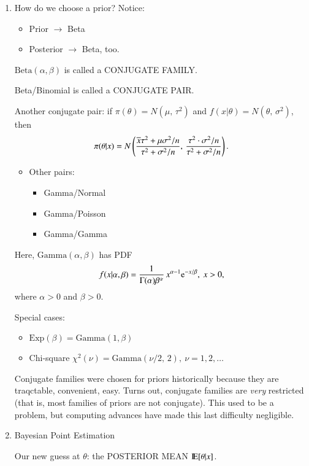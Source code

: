 \documentclass[11pt,english]{scrbook}
\begin{document}
\begin{enumerate}
\item How do we choose a prior?
\label{sec:orge958842}
Notice:
\begin{itemize}
\item Prior \(\to\) Beta
\item Posterior \(\to\) Beta, too.
\end{itemize}

\(\mathrm{Beta}(\alpha,\beta)\) is called a CONJUGATE FAMILY.

Beta/Binomial is called a CONJUGATE PAIR.

Another conjugate pair: if \(\pi(\theta) = N(\mu,\,\tau^{2})\) and  \(f(x|\theta) = N(\theta,\,\sigma^{2})\), then
\[
\pi(\theta|x) = N\left(\frac{\overline{x}\tau^{2}+\mu\sigma^{2}/n}{\tau^{2}+\sigma^{2}/n},\,\frac{\tau^{2}\cdot\sigma^{2}/n}{\tau^{2}+\sigma^{2}/n}  \right).
\]

\begin{itemize}
\item Other pairs:
\begin{itemize}
\item Gamma/Normal
\item Gamma/Poisson
\item Gamma/Gamma
\end{itemize}
\end{itemize}

Here, \(\mathrm{Gamma}(\alpha,\beta)\) has PDF
\[
f(x|\alpha,\beta) = \frac{1}{\Gamma(\alpha)\beta^{\alpha}}\,x^{\alpha - 1} \me^{-x/\beta},\ x > 0,
\]
where \(\alpha > 0\) and \(\beta > 0\).

Special cases:
\begin{itemize}
\item \(\mathrm{Exp}(\beta) = \mathrm{Gamma}(1,\beta)\)
\item Chi-square \(\chi^{2}(\nu) = \mathrm{Gamma}(\nu/2,\,2),\ \nu =1,2,\ldots\)
\end{itemize}

Conjugate families were chosen for priors historically because they are traqctable, convenient, easy.  Turns out, conjugate families are \emph{very} restricted (that is, most families of priors are not conjugate).  This used to be a problem, but computing advances have made this last difficulty negligible.

\item Bayesian Point Estimation
\label{sec:orgb322a58}

Our new guess at \(\theta\):  the POSTERIOR MEAN \(\mathrm{I\hspace{-1.5pt}E} [\theta|x]\).


\end{enumerate}
\end{document}
